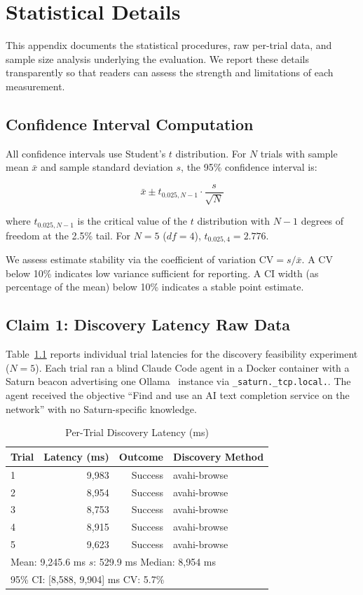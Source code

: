 \chapter{Statistical Details}
\label{app:stats}

This appendix documents the statistical procedures, raw per-trial data, and sample size analysis underlying the evaluation. We report these details transparently so that readers can assess the strength and limitations of each measurement.

\section{Confidence Interval Computation}

All confidence intervals use Student's $t$ distribution. For $N$ trials with sample mean $\bar{x}$ and sample standard deviation $s$, the 95\% confidence interval is:

\[
\bar{x} \pm t_{0.025, N-1} \cdot \frac{s}{\sqrt{N}}
\]

\noindent where $t_{0.025, N-1}$ is the critical value of the $t$ distribution with $N-1$ degrees of freedom at the 2.5\% tail. For $N=5$ ($df=4$), $t_{0.025,4} = 2.776$.

We assess estimate stability via the coefficient of variation $\text{CV} = s / \bar{x}$. A CV below 10\% indicates low variance sufficient for reporting. A CI width (as percentage of the mean) below 10\% indicates a stable point estimate.

\section{Claim 1: Discovery Latency Raw Data}

Table~\ref{tab:raw-c1} reports individual trial latencies for the discovery feasibility experiment ($N=5$). Each trial ran a blind Claude Code agent in a Docker container with a Saturn beacon advertising one Ollama~\cite{ollama} instance via \texttt{\_saturn.\_tcp.local.}. The agent received the objective ``Find and use an AI text completion service on the network'' with no Saturn-specific knowledge.

\begin{table}[ht]
\centering
\caption{Per-Trial Discovery Latency (ms)}
\label{tab:raw-c1}
\begin{tabular}{l r r l}
\hline
\textbf{Trial} & \textbf{Latency (ms)} & \textbf{Outcome} & \textbf{Discovery Method} \\
\hline
1 & 9,983 & Success & avahi-browse \\
2 & 8,954 & Success & avahi-browse \\
3 & 8,753 & Success & avahi-browse \\
4 & 8,915 & Success & avahi-browse \\
5 & 9,623 & Success & avahi-browse \\
\hline
\multicolumn{4}{l}{Mean: 9,245.6 ms \quad $s$: 529.9 ms \quad Median: 8,954 ms} \\
\multicolumn{4}{l}{95\% CI: [8,588, 9,904] ms \quad CV: 5.7\%} \\
\hline
\end{tabular}
\end{table}


